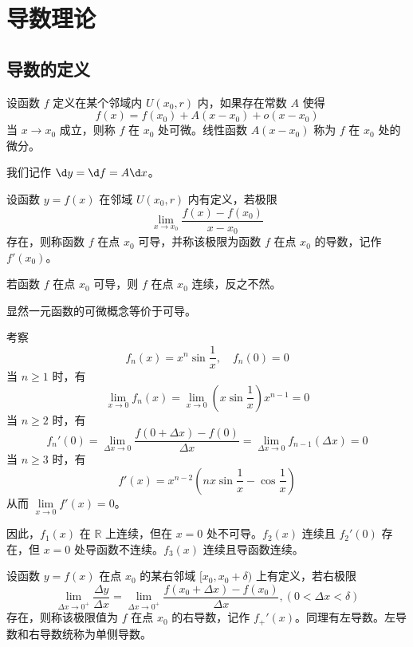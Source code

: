 \chapter{导数理论}

\section{导数的定义}

\begin{definition}[微分]
	设函数 $f$ 定义在某个邻域内 $U(x_0, r)$ 内，如果存在常数 $A$ 使得
	\[ f(x) = f(x_0) + A(x - x_0) + o(x - x_0) \]
	当 $x \to x_0$ 成立，则称 $f$ 在 $x_0$ 处可微。线性函数 $A(x-x_0)$ 称为 $f$ 在 $x_0$ 处的微分。
\end{definition}

我们记作 $\d y = \d f = A \d x$。

\begin{definition}[导数]
	设函数 $y=f(x)$ 在邻域 $U(x_0, r)$ 内有定义，若极限
	\[ \lim_{x\to x_0}\frac{f(x)-f(x_0)}{x-x_0} \]
	存在，则称函数 $f$ 在点 $x_0$ 可导，并称该极限为函数 $f$ 在点 $x_0$ 的导数，记作 $f'(x_0)$。
\end{definition}

\begin{theorem}
	若函数 $f$ 在点 $x_0$ 可导，则 $f$ 在点 $x_0$ 连续，反之不然。
\end{theorem}

显然一元函数的可微概念等价于可导。

\begin{example}
	考察
	\[ f_n(x) = x^n \sin \frac{1}{x}, \quad f_n(0) = 0 \]
	当 $n \geqslant 1$ 时，有
	\[ \lim_{x \to 0} f_n(x) = \lim_{x \to 0} \left( x \sin \frac{1}{x} \right) x^{n-1} = 0  \]
	当 $n \geqslant 2$ 时，有
	\[ f_n'(0) = \lim_{\Delta x \to 0} \frac{f(0 + \Delta x) - f(0)}{\Delta x} = \lim_{\Delta x \to 0} f_{n-1}(\Delta x) = 0 \]
	当 $n \geqslant 3$ 时，有
	\[ f'(x) = x^{n-2}\left(n x\sin \frac{1}{x} - \cos \frac{1}{x}\right) \]
	从而 $\lim\limits_{x \to 0} f'(x) = 0$。

	因此，$f_1(x)$ 在 $\mathbb{R}$ 上连续，但在 $x=0$ 处不可导。$f_2(x)$ 连续且 $f_2'(0)$ 存在，但 $x=0$ 处导函数不连续。$f_3(x)$ 连续且导函数连续。
\end{example}

\begin{definition}[单侧导数]
	设函数 $y=f(x)$ 在点 $x_0$ 的某右邻域 $[x_0,x_0+\delta)$ 上有定义，若右极限
	\[ \lim_{\Delta x\to 0^+}\frac{\Delta y}{\Delta x} = \lim_{\Delta x\to 0^+}\frac{f(x_0+\Delta x)-f(x_0)}{\Delta x},(0<\Delta x<\delta) \]
	存在，则称该极限值为 $f$ 在点 $x_0$ 的右导数，记作 $f_+'(x)$。同理有左导数。左导数和右导数统称为单侧导数。
\end{definition}



